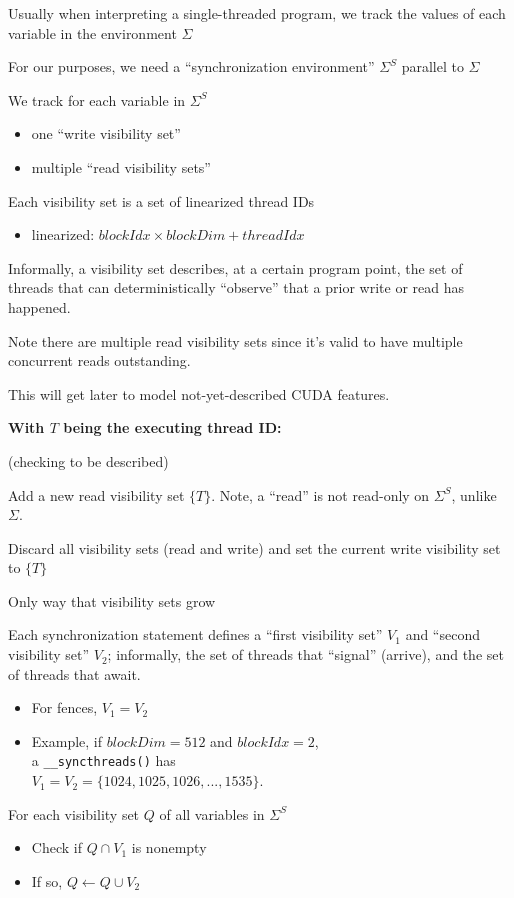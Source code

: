 \begin{minipage}[t]{0.5\textwidth}\fixminipage
Usually when interpreting a single-threaded program, we track the values of each variable in the environment $\Sigma$

For our purposes, we need a ``synchronization environment'' $\Sigma^S$ parallel to $\Sigma$

We track for each variable in $\Sigma^S$
\begin{itemize}
  \item one ``write visibility set''
  \item multiple ``read visibility sets''
\end{itemize}
Each visibility set is a set of linearized thread IDs
\begin{itemize}
  \item linearized: $blockIdx \times blockDim + threadIdx$
\end{itemize}
Informally, a visibility set describes, at a certain program point, the set of threads that can deterministically ``observe'' that a prior write or read has happened.

Note there are multiple read visibility sets since it's valid to have multiple concurrent reads outstanding.

This will get  later to model not-yet-described CUDA features.
\end{minipage}
\hfill
\begin{minipage}[t]{0.5\textwidth}\fixminipage
\textbf{With $T$ being the executing thread ID:}

 (checking to be described)

Add a new read visibility set $\{T\}$.
Note, a ``read'' is not read-only on $\Sigma^S$, unlike $\Sigma$.


Discard all visibility sets (read and write) and set the current write visibility set to $\{T\}$


Only way that visibility sets grow

Each synchronization statement defines a ``first visibility set'' $V_1$ and ``second visibility set'' $V_2$;
informally, the set of threads that ``signal'' (arrive), and the set of threads that await.
\begin{itemize}
  \item For fences, $V_1 = V_2$
  \item Example, if $blockDim=512$ and $blockIdx=2$,\\a \texttt{\_\_syncthreads()} has\\$V_1 = V_2 = \{1024, 1025, 1026, ... , 1535 \}$.
\end{itemize}

For each visibility set $Q$ of all variables in $\Sigma^S$
\begin{itemize}
  \item Check if $Q \cap V_1$ is nonempty
  \item If so, $Q \leftarrow Q \cup V_2$
\end{itemize}
\end{minipage}

